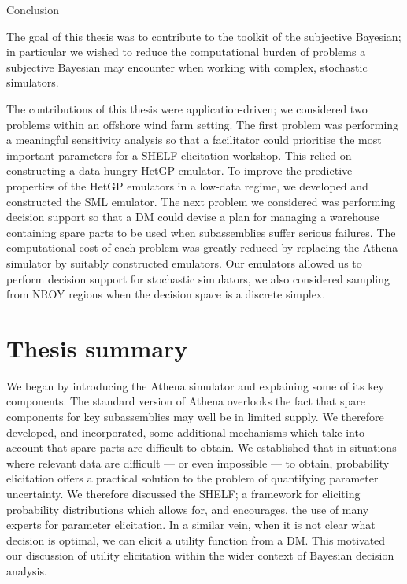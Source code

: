 \begin{chapter}{Conclusion \label{Ch:conclusions}}

The goal of this thesis was to contribute to the toolkit of the subjective Bayesian; in particular we wished to reduce the computational burden of problems a subjective Bayesian may encounter when working with complex, stochastic simulators.

The contributions of this thesis were application-driven; we considered two problems within an offshore wind farm setting. The first problem was performing a meaningful sensitivity analysis so that a facilitator could prioritise the most important parameters for a SHELF elicitation workshop. This relied on constructing a data-hungry HetGP emulator. To improve the predictive properties of the HetGP emulators in a low-data regime, we developed and constructed the SML emulator. The next problem we considered was performing decision support so that a DM could devise a plan for managing a warehouse containing spare parts to be used when subassemblies suffer serious failures. The computational cost of each problem was greatly reduced by replacing the Athena simulator by suitably constructed emulators. Our emulators allowed us to perform decision support for stochastic simulators, we also considered sampling from NROY regions when the decision space is a discrete simplex.

\section{Thesis summary}
We began by introducing the Athena simulator and explaining some of its key components. The standard version of Athena overlooks the fact that spare components for key subassemblies may well be in limited supply. We therefore developed, and incorporated, some additional mechanisms which take into account that spare parts are difficult to obtain. We established that in situations where relevant data are difficult --- or even impossible --- to obtain, probability elicitation offers a practical solution to the problem of quantifying parameter uncertainty. We therefore discussed the SHELF; a framework for eliciting probability distributions which allows for, and encourages, the use of many experts for parameter elicitation. In a similar vein, when it is not clear what decision is optimal, we can elicit a utility function from a DM. This motivated our discussion of utility elicitation within the wider context of Bayesian decision analysis.


\end{chapter}
